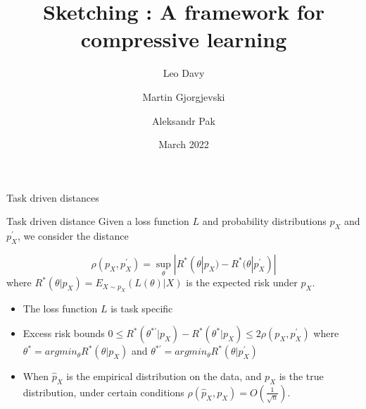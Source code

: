 \documentclass{beamer}
\title[Sketching and compressive learning]{Sketching : A framework for compressive learning}
\author[Davy, Gjorgjevski, Pak] %
{Leo Davy \and Martin Gjorgjevski \and Aleksandr Pak}
\institute[ENS Lyon] %
{
  ENS Lyon \\
  M2 Advanced Mathematics}
\date[Short Occasion] %
{March 2022}
\begin{document}
\maketitle







\begin{frame}{Task driven distances}
	\begin{block}{Task driven distance}
		Given a loss function $L$ and probability distributions $p_X$ and $p_X^'$, we consider the distance 
		
		\begin{equation*}
		    \rho(p_X,p_{X}^{'} )=\sup_{\theta}|R^*(\theta|p_X)-R^*(\theta|p_{X}^{'})|  
		\end{equation*}
		where $R^*(\theta|p_X)=E_{X\sim p_X}(L(\theta)|X)$ is the expected risk under $p_X$.
	
	\end{block}
	\begin{itemize}
	    \item The loss function $L$ is task specific
	    \item Excess risk bounds $0\leq R^*(\theta^{*'}|p_X)-R^*(\theta^{*}|p_X)\leq 2\rho(p_X,p_{X}^{'}) $ where $\theta^*=argmin_{\theta} R^*(\theta|p_X)$ and $\theta^{*'}=argmin_{\theta} R^*(\theta|p_{X}^{'})$
	    \item When $\hat{p}_X$ is the empirical distribution on the data, and $p_X$ is the true distribution, under certain conditions $\rho(\hat{p}_X,p_X)=O(\frac{1}{\sqrt{n}})$.
	\end{itemize}


\end{frame}
\end{document}
